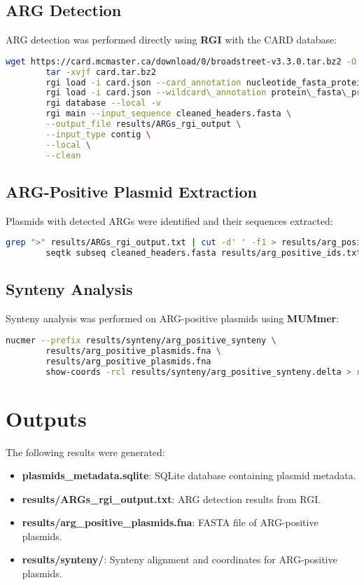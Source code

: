 \documentclass[a4paper,12pt]{report}
\begin{document}
	\subsection*{ARG Detection}
	ARG detection was performed directly using \textbf{RGI} with the CARD database:
	\begin{lstlisting}[language=bash]
		wget https://card.mcmaster.ca/download/0/broadstreet-v3.3.0.tar.bz2 -O card.tar.bz2
		tar -xvjf card.tar.bz2
		rgi load -i card.json --card_annotation nucleotide_fasta_protein_homolog_model.fasta --local
		rgi load -i card.json --wildcard\_annotation protein\_fasta\_protein\_variant\_model.fasta --local
		rgi database --local -v
		rgi main --input_sequence cleaned_headers.fasta \
		--output_file results/ARGs_rgi_output \
		--input_type contig \
		--local \
		--clean
	\end{lstlisting}
	
	\subsection*{ARG-Positive Plasmid Extraction}
	Plasmids with detected ARGs were identified and their sequences extracted:
	\begin{lstlisting}[language=bash]
		grep ">" results/ARGs_rgi_output.txt | cut -d' ' -f1 > results/arg_positive_ids.txt
		seqtk subseq cleaned_headers.fasta results/arg_positive_ids.txt > results/arg_positive_plasmids.fna
	\end{lstlisting}
	
	\subsection*{Synteny Analysis}
	Synteny analysis was performed on ARG-positive plasmids using \textbf{MUMmer}:
	\begin{lstlisting}[language=bash]
		nucmer --prefix results/synteny/arg_positive_synteny \
		results/arg_positive_plasmids.fna \
		results/arg_positive_plasmids.fna
		show-coords -rcl results/synteny/arg_positive_synteny.delta > results/synteny/arg_positive_synteny.coords
	\end{lstlisting}
	
	\section*{Outputs}
	The following results were generated:
	\begin{itemize}
		\item \textbf{plasmids\_metadata.sqlite}: SQLite database containing plasmid metadata.
		\item \textbf{results/ARGs\_rgi\_output.txt}: ARG detection results from RGI.
		\item \textbf{results/arg\_positive\_plasmids.fna}: FASTA file of ARG-positive plasmids.
		\item \textbf{results/synteny/}: Synteny alignment and coordinates for ARG-positive plasmids.
	\end{itemize}
	
\end{document}
